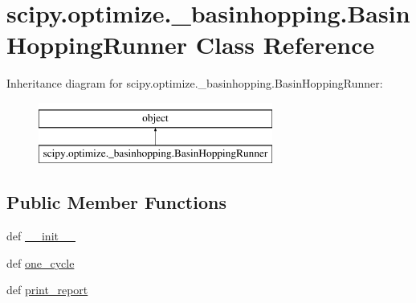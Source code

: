 \hypertarget{classscipy_1_1optimize_1_1__basinhopping_1_1BasinHoppingRunner}{}\section{scipy.\+optimize.\+\_\+basinhopping.\+Basin\+Hopping\+Runner Class Reference}
\label{classscipy_1_1optimize_1_1__basinhopping_1_1BasinHoppingRunner}
Inheritance diagram for scipy.\+optimize.\+\_\+basinhopping.\+Basin\+Hopping\+Runner\+:\begin{figure}[H]
\begin{center}
\leavevmode
\includegraphics[height=2.000000cm]{classscipy_1_1optimize_1_1__basinhopping_1_1BasinHoppingRunner}
\end{center}
\end{figure}
\subsection*{Public Member Functions}
\begin{DoxyCompactItemize}
\item 
def \hyperlink{classscipy_1_1optimize_1_1__basinhopping_1_1BasinHoppingRunner_afad665d3d37d7d6e29368db4ce3a4868}{\+\_\+\+\_\+init\+\_\+\+\_\+}
\item 
def \hyperlink{classscipy_1_1optimize_1_1__basinhopping_1_1BasinHoppingRunner_a0e3b8cac47e7e0b80a920dce62e3200d}{one\+\_\+cycle}
\item 
def \hyperlink{classscipy_1_1optimize_1_1__basinhopping_1_1BasinHoppingRunner_a3b1bf0f2b688a86b1ac7ad2f96f26a9d}{print\+\_\+report}
\end{DoxyCompactItemize}
